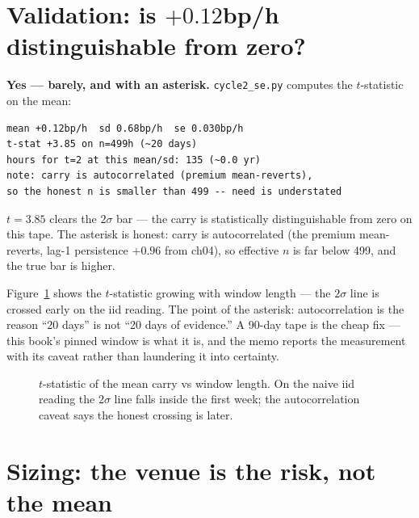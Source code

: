 \section{Validation: is $+0.12$bp/h distinguishable from zero?}\label{sec:val18}

\begin{example}\label{ex:tstat18}
\textbf{Yes --- barely, and with an asterisk.}
\texttt{cycle2\_se.py} computes the $t$-statistic on the mean:
\begin{verbatim}
mean +0.12bp/h  sd 0.68bp/h  se 0.030bp/h
t-stat +3.85 on n=499h (~20 days)
hours for t=2 at this mean/sd: 135 (~0.0 yr)
note: carry is autocorrelated (premium mean-reverts),
so the honest n is smaller than 499 -- need is understated
\end{verbatim}
$t=3.85$ clears the $2\sigma$ bar --- the carry is statistically
distinguishable from zero on this tape. The asterisk is
honest: carry is autocorrelated (the premium mean-reverts,
lag-1 persistence $+0.96$ from ch04), so effective $n$ is far
below 499, and the true bar is higher.
\begin{solution}
Figure~\ref{fig:tstat} shows the $t$-statistic growing with
window length --- the $2\sigma$ line is crossed early on the
iid reading. The point of the asterisk: autocorrelation is the
reason ``20 days'' is not ``20 days of evidence.'' A 90-day
tape is the cheap fix --- this book's pinned window is what it
is, and the memo reports the measurement with its caveat rather
than laundering it into certainty.
\end{solution}
\end{example}

\begin{figure}[htbp]\centering

\caption{$t$-statistic of the mean carry vs window length. On
the naive iid reading the $2\sigma$ line falls inside the first
week; the autocorrelation caveat says the honest crossing is
later.}
\label{fig:tstat}
\end{figure}

\section{Sizing: the venue is the risk, not the mean}\label{sec:size18}

